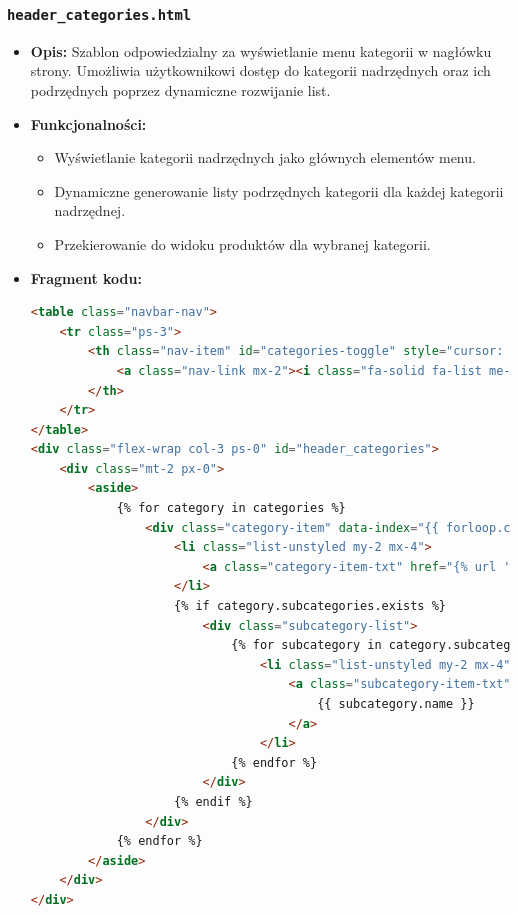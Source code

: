 \documentclass[12pt,a4paper,oneside]{article}
\theoremstyle{definition}
\numberwithin{equation}{section}
\begin{document}
\subsubsection*{\texttt{header\_categories.html}}
\begin{itemize}
    \item \textbf{Opis:}
    Szablon odpowiedzialny za wyświetlanie menu kategorii w nagłówku strony. Umożliwia użytkownikowi dostęp do kategorii nadrzędnych oraz ich podrzędnych poprzez dynamiczne rozwijanie list.
    \item \textbf{Funkcjonalności:}
    \begin{itemize}
        \item Wyświetlanie kategorii nadrzędnych jako głównych elementów menu.
        \item Dynamiczne generowanie listy podrzędnych kategorii dla każdej kategorii nadrzędnej.
        \item Przekierowanie do widoku produktów dla wybranej kategorii.
    \end{itemize}
    \item \textbf{Fragment kodu:}
    \begin{lstlisting}[language=HTML, caption=Szablon header\_categories.html]
<table class="navbar-nav">
    <tr class="ps-3">
        <th class="nav-item" id="categories-toggle" style="cursor: pointer" aria-expanded="false" title="Categories">
            <a class="nav-link mx-2"><i class="fa-solid fa-list me-2"></i>Kategorie</a>
        </th>
    </tr>
</table>
<div class="flex-wrap col-3 ps-0" id="header_categories">
    <div class="mt-2 px-0">
        <aside>
            {% for category in categories %}
                <div class="category-item" data-index="{{ forloop.counter0 }}">
                    <li class="list-unstyled my-2 mx-4">
                        <a class="category-item-txt" href="{% url 'category_products' category.id %}">{{ category.name }}</a>
                    </li>
                    {% if category.subcategories.exists %}
                        <div class="subcategory-list">
                            {% for subcategory in category.subcategories.all %}
                                <li class="list-unstyled my-2 mx-4">
                                    <a class="subcategory-item-txt" href="{% url 'category_products' subcategory.id %}">
                                        {{ subcategory.name }}
                                    </a>
                                </li>
                            {% endfor %}
                        </div>
                    {% endif %}
                </div>
            {% endfor %}
        </aside>
    </div>
</div>
    \end{lstlisting}
\end{itemize}
\end{document}
